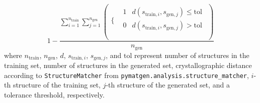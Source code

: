 \begin{equation} \label{eq:novelty}
	1-\frac{\sum _{i=1}^{n_{\text{train}}} \sum _{j=1}^{n_{\text{gen}}} \left(
\begin{array}{cc}
 \{ &
\begin{array}{cc}
 1 & d\left(s_{\text{train},i},s_{\text{gen},j}\right)\leq \text{tol} \\
 0 & d\left(s_{\text{train},i},s_{\text{gen},j}\right)>\text{tol} \\
\end{array}
 \\
\end{array}
\right)}{n_{\text{gen}}}
\end{equation}
where $n_{\text{train}}$, $n_{\text{gen}}$, $d$, $s_{\text{train},i}$, $s_{\text{gen},j}$, and $\text{tol}$ represent number of structures in the training set, number of structures in the generated set, crystallographic distance according to \texttt{StructureMatcher} from \texttt{pymatgen.analysis.structure\_matcher}, $i$-th structure of the training set, $j$-th structure of the generated set, and a tolerance threshold, respectively.
